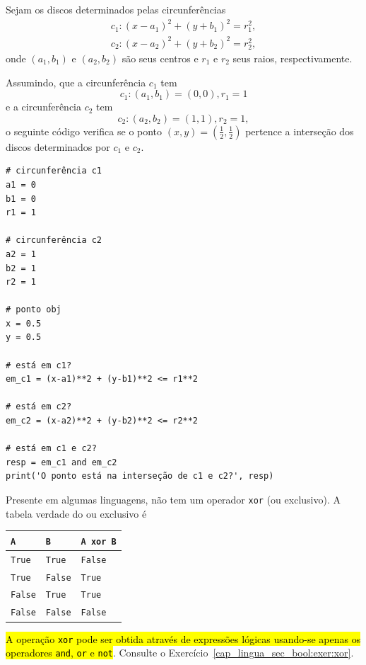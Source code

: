 \begin{ex}
  Sejam os discos determinados pelas circunferências
  \begin{gather}
    c_1: (x - a_1)^2 + (y + b_1)^2 = r_1^2,\\
    c_2: (x - a_2)^2 + (y + b_2)^2 = r_2^2,
  \end{gather}
  onde $(a_1, b_1)$ e $(a_2, b_2)$ são seus centros e $r_1$ e $r_2$ seus raios, respectivamente.

  Assumindo, que a circunferência $c_1$ tem
  \begin{equation}
    c_1: (a_1, b_1) = (0, 0), r_1 = 1
  \end{equation}
  e a circunferência $c_2$ tem
  \begin{equation}
    c_2: (a_2, b_2) = (1, 1), r_2 = 1,
  \end{equation}
  o seguinte código verifica se o ponto $(x, y) = \left(\frac{1}{2}, \frac{1}{2}\right)$ pertence a interseção dos discos determinados por $c_1$ e $c_2$.

\begin{lstlisting}
# circunferência c1
a1 = 0
b1 = 0
r1 = 1

# circunferência c2
a2 = 1
b2 = 1
r2 = 1

# ponto obj
x = 0.5
y = 0.5

# está em c1?
em_c1 = (x-a1)**2 + (y-b1)**2 <= r1**2

# está em c2?
em_c2 = (x-a2)**2 + (y-b2)**2 <= r2**2

# está em c1 e c2?
resp = em_c1 and em_c2
print('O ponto está na interseção de c1 e c2?', resp)
\end{lstlisting}
\end{ex}

\ifisbook
\vspace{0.5cm}
\fi

\begin{obs}\label{cap_lingua_sec_bool:obs:xor}
  Presente em algumas linguagens, {\python} não tem um operador \lstinline+xor+ (ou exclusivo). A tabela verdade do ou exclusivo é
  \begin{center}
    \begin{tabular}[H]{ll|l}
      {\lstinline+A+}     & {\lstinline+B+}     & {\lstinline+A xor B+} \\\hline
      {\lstinline+True+}  & {\lstinline+True+}  & {\lstinline+False+}   \\
      {\lstinline+True+}  & {\lstinline+False+} & {\lstinline+True+}    \\
      {\lstinline+False+} & {\lstinline+True+}  & {\lstinline+True+}    \\
      {\lstinline+False+} & {\lstinline+False+} & {\lstinline+False+}   \\\hline    
    \end{tabular}
  \end{center}
  \hl{A operação \texttt{xor} pode ser obtida através de expressões lógicas usando-se apenas os operadores \texttt{and}, \texttt{or} e \texttt{not}}. Consulte o Exercício~\ref{cap_lingua_sec_bool:exer:xor}.
\end{obs}

